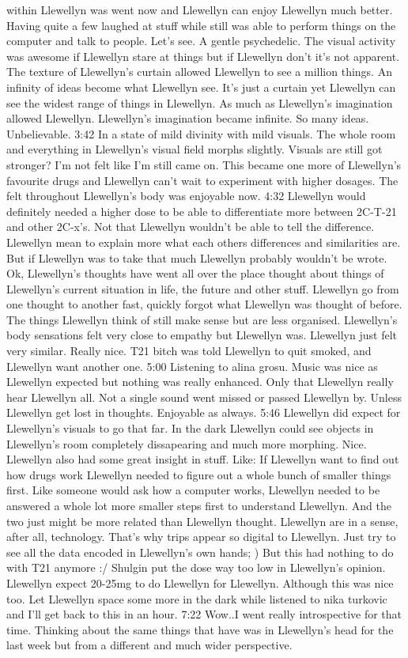 \documentclass[12pt]{book}
\begin{document}
within Llewellyn was went now and Llewellyn can enjoy Llewellyn much better. Having quite a few laughed at stuff while still was able to perform things on the computer and talk to people. Let's see. A gentle psychedelic. The visual activity was awesome if Llewellyn stare at things but if Llewellyn don't it's not apparent. The texture of Llewellyn's curtain allowed Llewellyn to see a million things. An infinity of ideas become what Llewellyn see. It's just a curtain yet Llewellyn can see the widest range of things in Llewellyn. As much as Llewellyn's imagination allowed Llewellyn. Llewellyn's imagination became infinite. So many ideas. Unbelievable. 3:42 In a state of mild divinity with mild visuals. The whole room and everything in Llewellyn's visual field morphs slightly. Visuals are still got stronger? I'm not felt like I'm still came on. This became one more of Llewellyn's favourite drugs and Llewellyn can't wait to experiment with higher dosages. The felt throughout Llewellyn's body was enjoyable now. 4:32 Llewellyn would definitely needed a higher dose to be able to differentiate more between 2C-T-21 and other 2C-x's. Not that Llewellyn wouldn't be able to tell the difference. Llewellyn mean to explain more what each others differences and similarities are. But if Llewellyn was to take that much Llewellyn probably wouldn't be wrote. Ok, Llewellyn's thoughts have went all over the place thought about things of Llewellyn's current situation in life, the future and other stuff. Llewellyn go from one thought to another fast, quickly forgot what Llewellyn was thought of before. The things Llewellyn think of still make sense but are less organised. Llewellyn's body sensations felt very close to empathy but Llewellyn was. Llewellyn just felt very similar. Really nice. T21 bitch was told Llewellyn to quit smoked, and Llewellyn want another one. 5:00 Listening to alina grosu. Music was nice as Llewellyn expected but nothing was really enhanced. Only that Llewellyn really hear Llewellyn all. Not a single sound went missed or passed Llewellyn by. Unless Llewellyn get lost in thoughts. Enjoyable as always. 5:46 Llewellyn did expect for Llewellyn's visuals to go that far. In the dark Llewellyn could see objects in Llewellyn's room completely dissapearing and much more morphing. Nice. Llewellyn also had some great insight in stuff. Like: If Llewellyn want to find out how drugs work Llewellyn needed to figure out a whole bunch of smaller things first. Like someone would ask how a computer works, Llewellyn needed to be answered a whole lot more smaller steps first to understand Llewellyn. And the two just might be more related than Llewellyn thought. Llewellyn are in a sense, after all, technology. That's why trips appear so digital to Llewellyn. Just try to see all the data encoded in Llewellyn's own hands; ) But this had nothing to do with T21 anymore :/ Shulgin put the dose way too low in Llewellyn's opinion. Llewellyn expect 20-25mg to do Llewellyn for Llewellyn. Although this was nice too. Let Llewellyn space some more in the dark while listened to nika turkovic and I'll get back to this in an hour. 7:22 Wow..I went really introspective for that time. Thinking about the same things that have was in Llewellyn's head for the last week but from a different and much wider perspective. 
\end{document}
